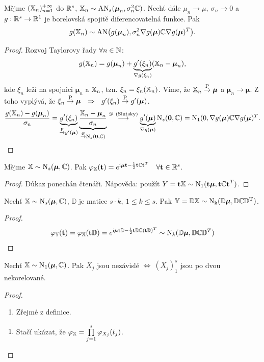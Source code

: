 \begin{theorem}
	Mějme $(\mathbb{X}_n)_{n=1}^{+\infty}$ do $\mathbb{R}^s$, $\mathbb{X}_n\sim\mathrm{AN}_s(\boldsymbol{\mu}_n,\sigma_n^2\mathbb{C})$. Nechť dále $\mu_n\to\mu,~\sigma_n\to 0$ a $g:\mathbb{R}^s\to\mathbb{R}^1$ je borelovská spojitě diferencovatelná funkce. Pak 
	$$ g(\mathbb{X}_n)\sim\mathrm{AN}\bigl(g(\boldsymbol{\mu}_n),\sigma_n^2\nabla g(\boldsymbol{\mu})\mathbb{C}\nabla g(\boldsymbol{\mu})^T\bigr). $$
	\begin{proof}
		Rozvoj Taylorovy řady $\forall n\in\mathbb{N}$:
		$$ g(\mathbb{X}_n)=g(\boldsymbol{\mu}_n)+\underbrace{g'(\xi_n)}_{\nabla g(\xi_n)}(\mathbb{X}_n-\boldsymbol{\mu}_n), $$
		kde $\xi_n$ leží na spojnici $\boldsymbol{\mu}_n$ a $\mathbb{X}_n$, tzn. $\xi_n=\xi_n(\mathbb{X}_n)$. Víme, že $\mathbb{X}_n\stackrel{\mathrm{P}}{\to} \boldsymbol{\mu}$ a $\boldsymbol{\mu}_n\to\boldsymbol{\mu}$. Z toho vyplývá, že $\xi_n\stackrel{\mathrm{P}}{\to} \boldsymbol{\mu}~~\Rightarrow~~ g'(\xi_n)\stackrel{\mathrm{P}}{\to} g'(\boldsymbol{\mu})$.
		$$ \frac{g(\mathbb{X}_n)-g(\boldsymbol{\mu}_n)}{\sigma_n}=\underbrace{g'(\xi_n)}_{\stackrel{\mathrm{P}}{\to} g'(\boldsymbol{\mu})}\underbrace{\frac{\mathbb{X}_n-\boldsymbol{\mu}_n}{\sigma_n}}_{\stackrel{\mathscr{D}}{\to} \mathrm{N}_s(\textbf{0},\mathbb{C})} \stackrel{\mathscr{D}~\text{(Slutsky)}}{\longrightarrow}\underbrace{g'(\boldsymbol{\mu})}_{\nabla g(\boldsymbol{\mu})}\mathrm{N}_s(\textbf{0},\mathbb{C})=\mathrm{N}_1(0,\nabla g(\boldsymbol{\mu})\mathbb{C}\nabla g(\boldsymbol{\mu})^T. $$
	\end{proof}
\end{theorem}
\begin{theorem}
	Mějme $\mathbb{X}\sim \mathrm{N}_s(\boldsymbol{\mu},\mathbb{C})$. Pak $\varphi_{\mathbb{X}}(\textbf{t})=e^{\mathrm{i} \boldsymbol{\mu}\textbf{t}-\frac{1}{2}\textbf{t}\mathbb{C}\textbf{t}^T}~~~\forall \textbf{t}\in\mathbb{R}^s$.
	\begin{proof}
		Důkaz ponechán čtenáři. Nápověda: použít $Y=\textbf{t}\mathbb{X}\sim\mathrm{N}_1(\textbf{t}\boldsymbol{\mu},\textbf{t}\mathbb{C}\textbf{t}^T)$.
	\end{proof}
\end{theorem}
\begin{theorem}
	Nechť $\mathbb{X}\sim\mathrm{N}_s(\boldsymbol{\mu},\mathbb{C})$, $\mathbb{D}$ je matice $s\cdot k,~1\leq k\leq s$. Pak $\mathbb{Y}=\mathbb{D}\mathbb{X}\sim \mathrm{N_k(\mathbb{D}\boldsymbol{\mu},\mathbb{D}\mathbb{C}\mathbb{D}^T)}$.\begin{proof}
		$$ \varphi_{\mathbb{Y}}(\textbf{t})=\varphi_{\mathbb{X}}(\textbf{t}\mathbb{D})=e^{\mathrm{i} \boldsymbol{\mu}\textbf{t}\mathbb{D}-\frac{1}{2}\textbf{t}\mathbb{D}\mathbb{C}(\textbf{t}\mathbb{D})^T} \sim \mathrm{N}_k(\mathbb{D}\boldsymbol{\mu},\mathbb{D}\mathbb{C}\mathbb{D}^T)$$
	\end{proof}
\end{theorem}
\begin{theorem}
	Nechť $\mathbb{X}\sim \mathrm{N}_1(\boldsymbol{\mu},\mathbb{C})$. Pak $X_j$ jsou nezávislé $\Leftrightarrow~(X_j)_1^s$ jsou po dvou nekorelované.
	\begin{proof}
		\begin{enumerate}[$\Rightarrow$:]
			\item Zřejmé z definice.
		\end{enumerate}
	\begin{enumerate}[$\Leftarrow$:]
	\item Stačí ukázat, že $\varphi_{\mathbb{X}}=\prod\limits_{j=1}^s \varphi_{X_j}(t_j)$.
\end{enumerate}
	\end{proof} 
\end{theorem}
